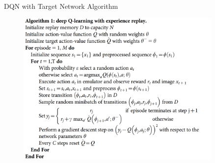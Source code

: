 \begin{frame}{DQN with Target Network Algorithm}
    \begin{figure}
        \centering
        \includegraphics[width=0.9\textwidth,height=0.9\textheight,keepaspectratio]{images/dqn+sarsa/dqn_target.png}
    \end{figure}
\end{frame}